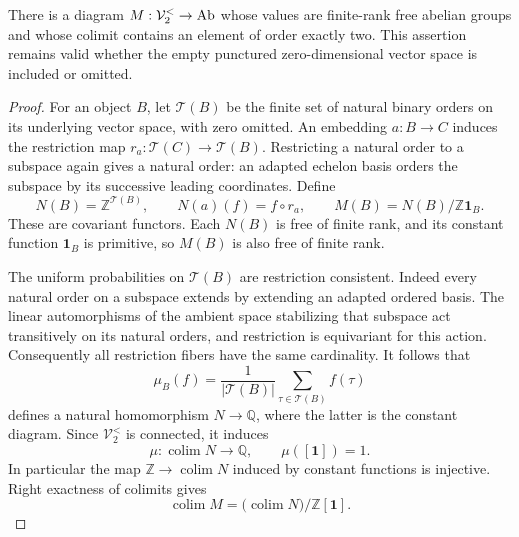 \begin{proposition}
\label{A:ordered-vector-integral-torsion}
There is a diagram $M:\mathcal V^{<}_2\to\mathrm{Ab}$ whose values are
finite-rank free abelian groups and whose colimit contains an element
of order exactly two. This assertion remains valid whether the empty
punctured zero-dimensional vector space is included or omitted.
\end{proposition}
\begin{proof}
For an object $B$, let $\mathcal T(B)$ be the finite set of natural
binary orders on its underlying vector space, with zero omitted.
An embedding $a:B\to C$ induces the restriction map
$r_a:\mathcal T(C)\to\mathcal T(B)$. Restricting a natural order to
a subspace again gives a natural order: an adapted echelon basis
orders the subspace by its successive leading coordinates. Define
\[
 N(B)=\mathbb Z^{\mathcal T(B)},\qquad
 N(a)(f)=f\circ r_a,\qquad
 M(B)=N(B)/\mathbb Z\mathbf1_B.
\]
These are covariant functors. Each $N(B)$ is free of finite rank,
and its constant function $\mathbf1_B$ is primitive, so $M(B)$ is
also free of finite rank.

The uniform probabilities on $\mathcal T(B)$ are restriction
consistent. Indeed every natural order on a subspace extends by
extending an adapted ordered basis. The linear automorphisms of the
ambient space stabilizing that subspace act transitively on its
natural orders, and restriction is equivariant for this action.
Consequently all restriction fibers have the same cardinality.
It follows that
\[
 \mu_B(f)=\frac1{|\mathcal T(B)|}
                \sum_{\tau\in\mathcal T(B)}f(\tau)
\]
defines a natural homomorphism $N\to\mathbb Q$, where the latter
is the constant diagram. Since $\mathcal V^{<}_2$ is connected,
it induces
\[
 \mu:\operatorname{colim}N\longrightarrow\mathbb Q,
 \qquad \mu([\mathbf1])=1.
\]
In particular the map $\mathbb Z\to\operatorname{colim}N$ induced
by constant functions is injective. Right exactness of colimits gives
\[
 \operatorname{colim}M
   =\bigl(\operatorname{colim}N\bigr)/\mathbb Z[\mathbf1].
 \tag{IT.1}
\]


\end{proof}
